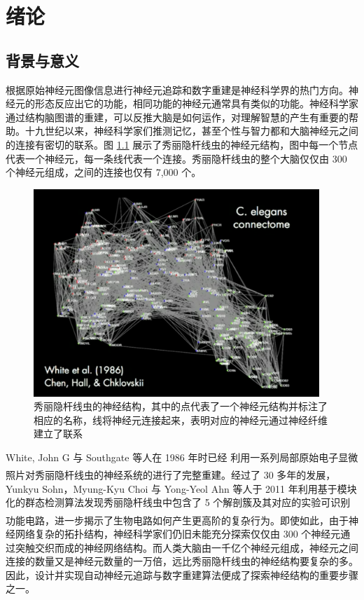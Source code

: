 \newcommand{\upcite}[1]{\textsuperscript{\textsuperscript{\cite{#1}}}}
\chapter{绪论}
\section{背景与意义}

根据原始神经元图像信息进行神经元追踪和数字重建是神经科学界的热门方向。神经元的形态反应出它的功能，相同功能的神经元通常具有类似的功能。神经科学家通过结构脑图谱的重建，可以反推大脑是如何运作，对理解智慧的产生有重要的帮助。十九世纪以来，神经科学家们推测记忆，甚至个性与智力都和大脑神经元之间的连接有密切的联系。图 \ref{worm} 展示了秀丽隐杆线虫的神经元结构，图中每一个节点代表一个神经元，每一条线代表一个连接。秀丽隐杆线虫的整个大脑仅仅由 300 个神经元组成，之间的连接也仅有 7,000 个。

\begin{figure}[!ht]
\centering
\includegraphics[width=108mm]{images/worm}
\caption{秀丽隐杆线虫的神经结构，其中的点代表了一个神经元结构并标注了相应的名称，线将神经元连接起来，表明对应的神经元通过神经纤维建立了联系}
\label{worm}
\end{figure}

White, John G 与 Southgate 等人在 1986 年时已经 利用一系列局部原始电子显微照片对秀丽隐杆线虫的神经系统的进行了完整重建\upcite{white1986structure}。经过了 30 多年的发展，Yunkyu Sohn，Myung-Kyu Choi 与 Yong-Yeol Ahn 等人于 2011 年利用基于模块化的群态检测算法发现秀丽隐杆线虫中包含了 5 个解剖簇及其对应的实验可识别功能电路，进一步揭示了生物电路如何产生更高阶的复杂行为\upcite{varshney2011structural}。即使如此，由于神经网络复杂的拓扑结构，神经科学家们仍旧未能充分探索仅仅由 300 个神经元通过突触交织而成的神经网络结构。而人类大脑由一千亿个神经元组成，神经元之间连接的数量又是神经元数量的一万倍，远比秀丽隐杆线虫的神经结构要复杂的多。因此，设计并实现自动神经元追踪与数字重建算法便成了探索神经结构的重要步骤之一。

